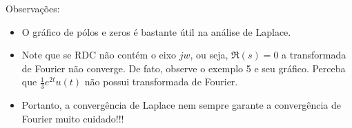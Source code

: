 \documentclass[9pt]{beamer}
\begin{document}
 \begin{frame} {Observa\c{c}\~{o}es:}
  \par
  \begin{itemize}
    \item O gr\'{a}fico de p\'{o}los e zeros \'{e} bastante \'{u}til  na an\'{a}lise de Laplace. 
    \item   Note que se RDC n\~{a}o cont\'{e}m o eixo $jw$, ou seja, $ \Re(s) = 0$ a transformada de Fourier n\~{a}o converge.  De fato, observe o exemplo 5 e seu gr\'{a}fico. Perceba que
      $ \frac {1} {3} e^{2t} u(t)$ n\~{a}o possui transformada de Fourier.
   \item   Portanto, a converg\^{e}ncia de Laplace nem sempre garante a converg\^{e}ncia de Fourier muito cuidado!!! 
  \end{itemize}
\end{frame}
\end{document}
